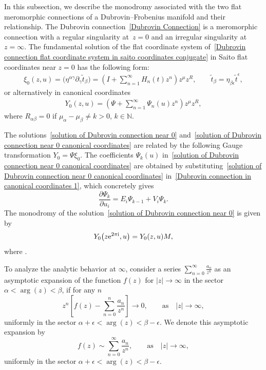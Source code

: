 \documentclass[11pt]{article}
\numberwithin{equation}{section}
\numberwithin{equation}{section}
\begin{document}
In this subsection, we describe the monodromy associated with the two flat meromorphic connections of a Dubrovin--Frobenius manifold and their relationship.
The Dubrovin connection~\eqref{Dubrovin Connection} is a meromorphic connection with a regular singularity at~${z=0}$ and an irregular singularity at $z=\infty$. The fundamental solution of the flat coordinate system of~\eqref{Dubrovin connection flat coordinate system in saito coordinates conjugate} in Saito flat coordinates near $z=0$ has the following form:
\begin{gather}
 \xi_0(z,u)=\bigl(\eta^{\alpha\gamma}\partial_{\gamma}\tilde t_{\beta}\bigr)=\left(I+\sum_{n=1}^{\infty}H_n(t)z^n \right)z^{\mu}z^R, \qquad \tilde t_{\beta}=\eta_{\beta\epsilon}\tilde t^{\epsilon},\label{solution of Dubrovin connection near 0}
\end{gather}
or alternatively in canonical coordinates
\begin{gather}\label{solution of Dubrovin connection near 0 canonical coordinates}
 Y_0(z,u)=\left(\Psi+\sum_{n=1}^{\infty}\Psi_n(u)z^n \right)z^{\mu}z^R,
\end{gather}
where $R_{\alpha\beta}=0$ if $\mu_{\alpha}-\mu_{\beta} \neq k>0$, $k\in \mathbb{N}$.

The solutions~\eqref{solution of Dubrovin connection near 0} and~\eqref{solution of Dubrovin connection near 0 canonical coordinates} are related by the following Gauge transformation
$ Y_0=\Psi \xi_0$.
The coefficients $\Psi_k(u)$ in~\eqref{solution of Dubrovin connection near 0 canonical coordinates} are obtained by substituting~\eqref{solution of Dubrovin connection near 0 canonical coordinates} in~\eqref{Dubrovin connection in canonical coordinates 1}, which concretely gives
\[
 \frac{\partial \Psi_k}{\partial u_i}=E_i\Psi_{k-1}+V_i\Psi_k.
 \]
The monodromy of the solution~\eqref{solution of Dubrovin connection near 0} is given by
\[
Y_0\bigl(z{\rm e}^{2\pi {\rm i}},u\bigr)=Y_0(z,u)M,
\]
 where .

To analyze the analytic behavior at $\infty$, consider a series
$\sum_{n=0}^{\infty} \frac{a_n}{z^n}$
as an asymptotic expansion of the function $f(z)$ for
$
\lvert z \rvert \to \infty$ in the sector $\alpha < \arg(z) < \beta$,
if for any $n$
\[
z^n\left[f(z)- \sum_{n=0}^{n} \frac{a_n}{z^n} \right] \to 0, \qquad \text{as} \quad \lvert z \rvert \to \infty,
\]
uniformly in the sector $ \alpha+\epsilon < \arg(z) < \beta-\epsilon$.
We denote this asymptotic expansion by{\samepage
\[
f(z)\sim\sum_{n=0}^{\infty} \frac{a_n}{z^n} , \qquad \text{as} \quad \lvert z \rvert \to \infty,
\]
uniformly in the sector $\alpha+\epsilon < \arg(z) < \beta-\epsilon$.}
\end{document}
